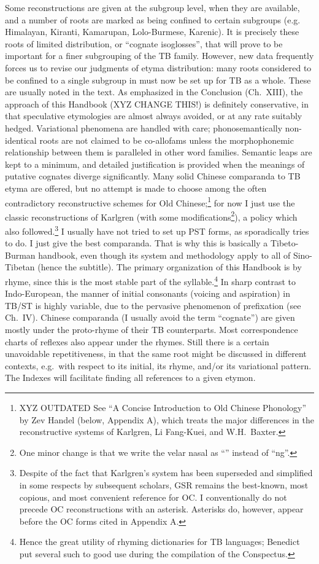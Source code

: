 Some reconstructions are given at the subgroup level, when they are available, and a number of roots are marked as being confined to certain subgroups (e.g. Himalayan, Kiranti, Kamarupan, Lolo-Burmese, Karenic). It is precisely these roots of limited distribution, or “cognate isoglosses”, that will prove to be important for a finer subgrouping of the TB family. However, new data frequently forces us to revise our judgments of etyma distribution: many roots considered to be confined to a single subgroup in \textit{} must now be set up for TB as a whole. These are usually noted in the text.
As emphasized in the Conclusion (Ch.~XIII), the approach of this Handbook (XYZ CHANGE THIS!) is definitely conservative, in that speculative etymologies are almost always avoided, or at any rate suitably hedged. Variational phenomena are handled with care; phonosemantically non-identical roots are not claimed to be co-allofams unless the morphophonemic relationship between them is paralleled in other word families. Semantic leaps are kept to a minimum, and detailed justification is provided when the meanings of putative cognates diverge significantly. Many solid Chinese comparanda to TB etyma are offered, but no attempt is made to choose among the often contradictory reconstructive schemes for Old Chinese;\footnote{XYZ OUTDATED See “A Concise Introduction to Old Chinese Phonology” by Zev Handel (below, Appendix A), which treats the major differences in the reconstructive systems of Karlgren, Li Fang-Kuei, and W.H.\ Baxter.} for now I just use the classic reconstructions of Karlgren (with some modifications\footnote{One minor change is that we write the velar nasal as “{\ng}” instead of “ng”.}), a policy which \textit{} also followed.\footnote{Despite of the fact that Karlgren’s system has been superseded and simplified in some respects by subsequent scholars, GSR remains the best-known, most copious, and most convenient reference for OC. I conventionally do not precede OC reconstructions with an asterisk. Asterisks do, however, appear before the OC forms cited in Appendix A.} I usually have not tried to set up PST forms, as \textit{} sporadically tries to do. I just give the best comparanda. That is why this is basically a Tibeto-Burman handbook, even though its system and methodology apply to all of Sino-Tibetan (hence the subtitle).
The primary organization of this Handbook is by rhyme, since this is the most stable part of the syllable.\footnote{Hence the great utility of rhyming dictionaries for TB languages; Benedict put several such to good use during the compilation of the Conspectus.} In sharp contrast to Indo-European, the manner of initial consonants (voicing and aspiration) in TB/ST is highly variable, due to the pervasive phenomenon of prefixation (see Ch.~IV). Chinese comparanda (I usually avoid the term “cognate”) are given mostly under the proto-rhyme of their TB counterparts. Most correspondence charts of reflexes also appear under the rhymes. Still there is a certain unavoidable repetitiveness, in that the same root might be discussed in different contexts, e.g.\ with respect to its initial, its rhyme, and/or its variational pattern. The Indexes will facilitate finding all references to a given etymon.
